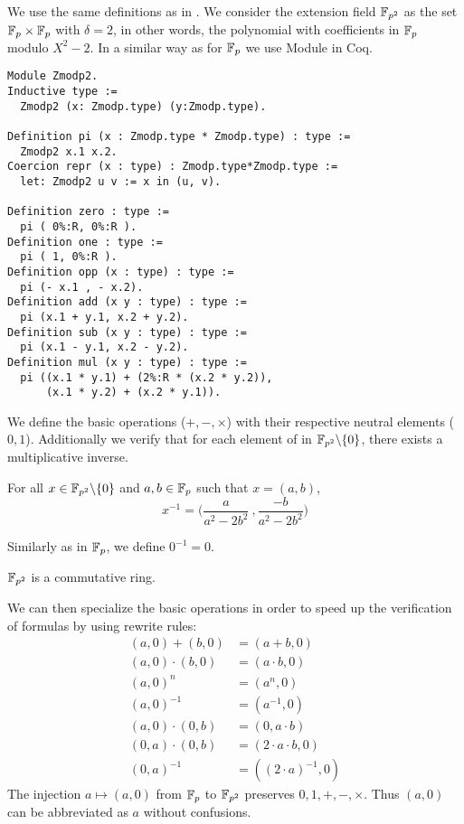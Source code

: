 We use the same definitions as in \cite{Ber06}. We consider the extension field $\mathbb{F}_{p^2}$ as the set $\mathbb{F}_{p} \times \mathbb{F}_{p}$ with $\delta = 2$, in other words,
the polynomial with coefficients in $\mathbb{F}_{p}$ modulo $X^2 - 2$. In a similar way as for $\mathbb{F}_{p}$ we use Module in Coq.
\begin{lstlisting}[language=Coq]
Module Zmodp2.
Inductive type :=
  Zmodp2 (x: Zmodp.type) (y:Zmodp.type).

Definition pi (x : Zmodp.type * Zmodp.type) : type :=
  Zmodp2 x.1 x.2.
Coercion repr (x : type) : Zmodp.type*Zmodp.type :=
  let: Zmodp2 u v := x in (u, v).

Definition zero : type :=
  pi ( 0%:R, 0%:R ).
Definition one : type :=
  pi ( 1, 0%:R ).
Definition opp (x : type) : type :=
  pi (- x.1 , - x.2).
Definition add (x y : type) : type :=
  pi (x.1 + y.1, x.2 + y.2).
Definition sub (x y : type) : type :=
  pi (x.1 - y.1, x.2 - y.2).
Definition mul (x y : type) : type :=
  pi ((x.1 * y.1) + (2%:R * (x.2 * y.2)),
      (x.1 * y.2) + (x.2 * y.1)).
\end{lstlisting}
We define the basic operations ($+, -, \times$) with their respective neutral elements ($0, 1$).
Additionally we verify that for each element of in $\mathbb{F}_{p^2}\backslash\{0\}$, there exists a multiplicative inverse.
\begin{lemma} For all $x \in \mathbb{F}_{p^2}\backslash\{0\}$ and $a,b \in \mathbb{F}_{p}$ such that $x = (a,b)$,
$$x^{-1} = \Big(\frac{a}{a^2-2b^2}\ , \frac{-b}{a^2-2b^2}\Big)$$
\end{lemma}
Similarly as in $\mathbb{F}_{p}$, we define $0^{-1} = 0$.
\begin{lemma}
$\mathbb{F}_{p^2}$ is a commutative ring.
\end{lemma}
We can then specialize the basic operations in order to speed up the verification of formulas by using rewrite rules:
\begin{align*}
(a,0) + (b,0) &= (a+b, 0)\\
(a,0) \cdot   (b,0) &= (a \cdot b, 0)\\
(a, 0)^n &= (a^n, 0)\\
(a, 0)^{-1} &= (a^{-1}, 0)\\
(a, 0)\cdot (0,b) &= (0, a\cdot b)\\
(0, a)\cdot (0,b) &= (2\cdot a\cdot b, 0)\\
(0,a)^{-1} &= ((2\cdot a)^{-1},0)
\end{align*}
The injection $a \mapsto (a,0)$ from $\mathbb{F}_{p}$ to $\mathbb{F}_{p^2}$ preserves $0, 1, +, -, \times$. Thus $(a,0)$ can be abbreviated as $a$ without confusions.

